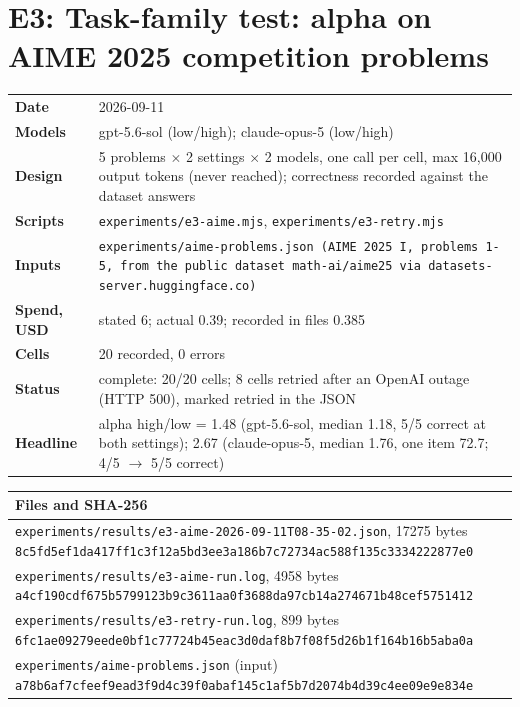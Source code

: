 \documentclass[11pt]{article}
\begin{document}
\section*{E3: Task-family test: alpha on AIME 2025 competition problems}
\begin{longtable}{@{}p{}p{}@{}}\toprule
\textbf{Date} & 2026-09-11 \\
\textbf{Models} & gpt-5.6-sol (low/high); claude-opus-5 (low/high) \\
\textbf{Design} & 5 problems $\times$ 2 settings $\times$ 2 models, one call per cell, max 16,000 output tokens (never reached); correctness recorded against the dataset answers \\
\textbf{Scripts} & \texttt{experiments/e3-aime.mjs}, \texttt{experiments/e3-retry.mjs} \\
\textbf{Inputs} & \texttt{experiments/aime-problems.json (AIME 2025 I, problems 1-5, from the public dataset math-ai/aime25 via datasets-server.huggingface.co)} \\
\textbf{Spend, USD} & stated 6; actual 0.39; recorded in files 0.385 \\
\textbf{Cells} & 20 recorded, 0 errors \\
\textbf{Status} & complete: 20/20 cells; 8 cells retried after an OpenAI outage (HTTP 500), marked retried in the JSON \\
\textbf{Headline} & alpha high/low = 1.48 (gpt-5.6-sol, median 1.18, 5/5 correct at both settings); 2.67 (claude-opus-5, median 1.76, one item 72.7; 4/5 $\rightarrow$ 5/5 correct) \\
\bottomrule\end{longtable}
\begin{longtable}{@{}p{}@{}}\toprule
\textbf{Files and SHA-256} \\\midrule
\texttt{experiments/results/e3-aime-2026-09-11T08-35-02.json}, 17275 bytes \newline \texttt{\scriptsize 8c5fd5ef1da417ff1c3f12a5bd3ee3a186b7c72734ac588f135c3334222877e0} \\[2pt]
\texttt{experiments/results/e3-aime-run.log}, 4958 bytes \newline \texttt{\scriptsize a4cf190cdf675b5799123b9c3611aa0f3688da97cb14a274671b48cef5751412} \\[2pt]
\texttt{experiments/results/e3-retry-run.log}, 899 bytes \newline \texttt{\scriptsize 6fc1ae09279eede0bf1c77724b45eac3d0daf8b7f08f5d26b1f164b16b5aba0a} \\[2pt]
\texttt{experiments/aime-problems.json} (input) \newline \texttt{\scriptsize a78b6af7cfeef9ead3f9d4c39f0abaf145c1af5b7d2074b4d39c4ee09e9e834e} \\[2pt]
\bottomrule\end{longtable}
\end{document}
